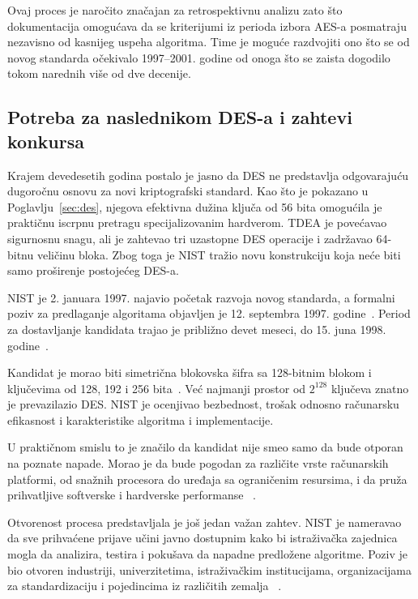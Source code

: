 Ovaj proces je naročito značajan za retrospektivnu analizu zato što
dokumentacija omogućava da se kriterijumi iz perioda izbora AES-a
posmatraju nezavisno od kasnijeg uspeha algoritma. Time je moguće
razdvojiti ono što se od novog standarda očekivalo 1997--2001. godine
od onoga što se zaista dogodilo tokom narednih više od dve decenije.


\subsection{Potreba za naslednikom DES-a i zahtevi konkursa}
\label{subsec:aes_potreba}

Krajem devedesetih godina postalo je jasno da DES ne predstavlja
odgovarajuću dugoročnu osnovu za novi kriptografski standard. Kao što
je pokazano u Poglavlju~\ref{sec:des}, njegova efektivna dužina ključa
od 56 bita omogućila je praktičnu iscrpnu pretragu specijalizovanim
hardverom. TDEA je povećavao sigurnosnu snagu, ali je zahtevao
tri uzastopne DES operacije i zadržavao 64-bitnu veličinu bloka. Zbog
toga je NIST tražio novu konstrukciju koja neće biti samo proširenje
postojećeg DES-a.

NIST je 2. januara 1997. najavio početak razvoja novog standarda, a
formalni poziv za predlaganje algoritama objavljen je 12. septembra
1997. godine~\cite{nist-aes-development,nist-aes-call-1997}. Period
za dostavljanje kandidata trajao je približno devet meseci, do
15. juna 1998. godine~\cite{nist-aes-history}.

Kandidat je morao biti simetrična blokovska šifra sa 128-bitnim blokom
i ključevima od 128, 192 i 256 bita~\cite{nist-aes-call-1997,nist-aes-history}.
Već najmanji prostor od $2^{128}$ ključeva znatno je prevazilazio DES.
NIST je ocenjivao bezbednost, trošak odnosno računarsku efikasnost i
karakteristike algoritma i implementacije.

U praktičnom smislu to je značilo da kandidat nije smeo samo da bude
otporan na poznate napade. Morao je da bude pogodan za različite vrste
računarskih platformi, od snažnih procesora do uređaja sa ograničenim
resursima, i da pruža prihvatljive softverske i hardverske performanse
~\cite{nist-aes-report-2001}.

Otvorenost procesa predstavljala je još jedan važan zahtev. NIST je
nameravao da sve prihvaćene prijave učini javno dostupnim kako bi
istraživačka zajednica mogla da analizira, testira i pokušava da napadne
predložene algoritme. Poziv je bio otvoren industriji, univerzitetima,
istraživačkim institucijama, organizacijama za standardizaciju i
pojedincima iz različitih zemalja
~\cite{nist-aes-call-1997}.

